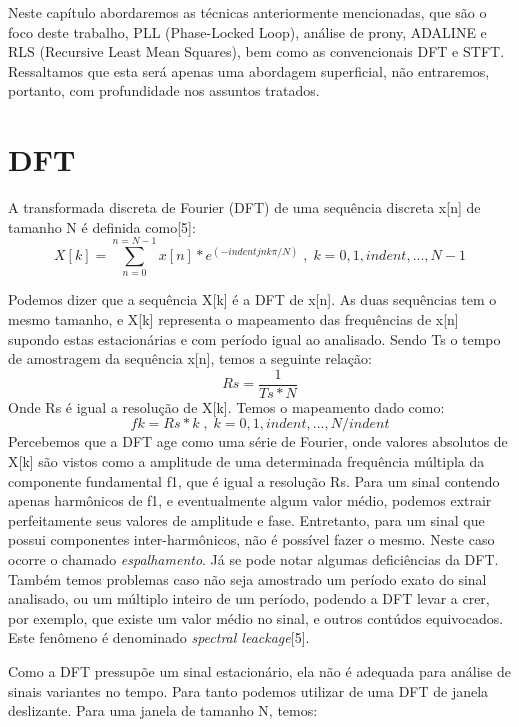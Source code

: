 \documentclass[a4paper, 12pt]{book}
\begin{document}
Neste capítulo abordaremos as técnicas anteriormente mencionadas, que são o foco deste trabalho, PLL (Phase-Locked Loop), análise de prony, ADALINE e RLS (Recursive Least Mean Squares), bem como as convencionais DFT e STFT. Ressaltamos que esta será apenas uma abordagem superficial, não entraremos, portanto, com profundidade nos assuntos tratados.

\section{DFT}
A transformada discreta de Fourier (DFT) de uma sequência discreta {x[n]} de tamanho N é definida como[5]:
\begin{equation}
X[k]=\sum_{n=0}^{n=N-1} x[n]*e^{(-indentjnk\pi/N)}\;,\;k=0,1,indent,...,N-1
\end{equation}

Podemos dizer que a sequência X[k] é a DFT de x[n]. As duas sequências tem o mesmo tamanho, e X[k] representa o mapeamento das frequências de x[n] supondo estas estacionárias e com período igual ao analisado. Sendo Ts o tempo de amostragem da sequência x[n], temos a seguinte relação:
\begin{equation}
Rs=\frac{1}{Ts*N}
\end{equation}
\indent Onde Rs é igual a resolução de X[k]. Temos o mapeamento dado como:
\begin{equation}
fk=Rs*k\;,\;k=0, 1, indent,...,N/indent
\end{equation}
\indent Percebemos que a DFT age como uma série de Fourier, onde valores absolutos de X[k] são vistos como a amplitude de uma determinada frequência múltipla da componente fundamental f1, que é igual a resolução Rs. Para um sinal contendo apenas harmônicos de f1, e eventualmente algum valor médio, podemos extrair perfeitamente seus valores de amplitude e fase. Entretanto, para um sinal que possui componentes inter-harmônicos, não é possível fazer o mesmo. Neste caso ocorre o chamado \textit{espalhamento}. Já se pode notar algumas deficiências da DFT. Também temos problemas caso não seja amostrado um período exato do sinal analisado, ou um múltiplo inteiro de um período, podendo a DFT levar a crer, por exemplo, que existe um valor médio no sinal, e outros contúdos equivocados. Este fenômeno é denominado \textit{spectral leackage}[5]. 

\indent Como a DFT pressupõe um sinal estacionário, ela não é adequada para análise de sinais variantes no tempo. Para tanto podemos utilizar de uma DFT de janela deslizante. Para uma janela de tamanho N, temos:
\end{document}
